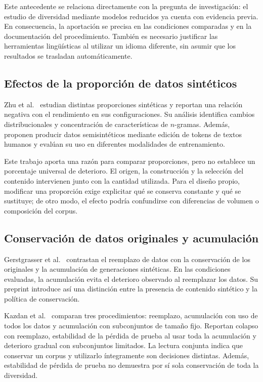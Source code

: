 \documentclass[12pt,letterpaper]{article}
\begin{document}
Este antecedente se relaciona directamente con la pregunta de investigación:
el estudio de diversidad mediante modelos reducidos ya cuenta con evidencia
previa. En consecuencia, la aportación se precisa en las condiciones
comparadas y en la documentación del procedimiento. También es necesario
justificar las herramientas lingüísticas al utilizar un idioma diferente,
sin asumir que los resultados se trasladan automáticamente.

\subsection{Efectos de la proporción de datos sintéticos}

Zhu et al.\ \cite{zhu2025} estudian distintas proporciones sintéticas y
reportan una relación negativa con el rendimiento en sus configuraciones.
Su análisis identifica cambios distribucionales y concentración de
características de \(n\)-gramas. Además, proponen producir datos
semisintéticos mediante edición de tokens de textos humanos y evalúan
su uso en diferentes modalidades de entrenamiento.

Este trabajo aporta una razón para comparar proporciones, pero no establece
un porcentaje universal de deterioro. El origen, la construcción y la
selección del contenido intervienen junto con la cantidad utilizada.
Para el diseño propio, modificar una proporción exige explicitar qué
se conserva constante y qué se sustituye; de otro modo, el efecto podría
confundirse con diferencias de volumen o composición del corpus.

\subsection{Conservación de datos originales y acumulación}

Gerstgrasser et al.\ \cite{gerstgrasser2024} contrastan el reemplazo de datos
con la conservación de los originales y la acumulación de generaciones
sintéticas. En las condiciones evaluadas, la acumulación evita el deterioro
observado al reemplazar los datos. Su preprint introduce así una distinción
entre la presencia de contenido sintético y la política de conservación.

Kazdan et al.\ \cite{kazdan2025} comparan tres procedimientos: reemplazo,
acumulación con uso de todos los datos y acumulación con subconjuntos de
tamaño fijo. Reportan colapso con reemplazo, estabilidad de la pérdida de
prueba al usar toda la acumulación y deterioro gradual con subconjuntos
limitados. La lectura conjunta indica que conservar un corpus y utilizarlo
íntegramente son decisiones distintas. Además, estabilidad de pérdida de
prueba no demuestra por sí sola conservación de toda la diversidad.
\end{document}
